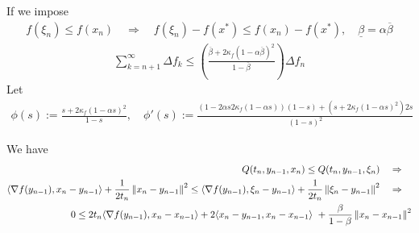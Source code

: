 \documentclass[english,12pt,a4paper]{article}
\begin{document}
%
%
%
\begin{blueenv}
If we impose
%
%
\begin{align*}
f(\xi_n) \le  f(x_n)
\quad\Rightarrow\quad  
f(\xi_n) - f(x^*) \le  f(x_n) -f(x^*),\quad \underline{\beta} = \alpha \overline{\beta}
\end{align*}
%
%
\begin{align*}
\sum_{k=n+1}^{\infty} \Delta f_k\le \left( 
\frac{\overline{\beta}+2\kappa_f(1-\alpha\overline{\beta})^2}{1-\overline{\beta}}
\right) \Delta f_n
\end{align*}
%
Let 
%
\begin{align*}
\phi(s) := \frac{s+2\kappa_f(1-\alpha s)^2}{1-s},\quad
\phi'(s) := \frac{(1-2\alpha s2\kappa_f(1-\alpha s))(1-s) + \left(s+2\kappa_f(1-\alpha s)^2\right)2s}{(1-s)^2}
\end{align*}
%
\end{blueenv}
%

%
\begin{greenenv}
%
We have 
%
\begin{align*}
Q(t_n, y_{n-1}, x_n) \le Q(t_n, y_{n-1}, \xi_n)
\quad\Rightarrow\quad\\ 
\scp{\nabla f(y_{n-1})}{x_n-y_{n-1}} + \frac{1}{2t_n}\norm{x_n-y_{n-1}}^2
\le 
\scp{\nabla f(y_{n-1})}{\xi_n-y_{n-1}} + \frac{1}{2t_n}\norm{\xi_n-y_{n-1}}^2
\quad\Rightarrow\quad\\ 
0
\le 
2t_n\scp{\nabla f(y_{n-1})}{x_n-x_{n-1}} + 2\scp{x_n-y_{n-1}}{x_n-x_{n-1}} + \frac{\beta}{1-\beta}\norm{x_n-x_{n-1}}^2
\end{align*}
%

%
\end{greenenv}
%





\end{document}
